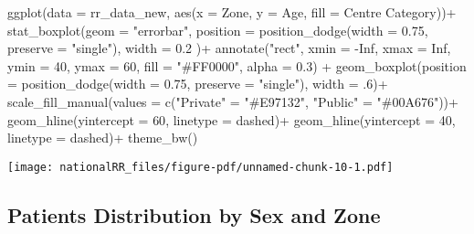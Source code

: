 \documentclass[
  letterpaper,
  DIV=11,
  numbers=noendperiod]{scrartcl}
\newenvironment{Shaded}{\begin{snugshade}}{\end{snugshade}}
\newcommand{\AttributeTok}[1]{\textcolor[rgb]{0.40,0.45,0.13}{#1}}
\newcommand{\ConstantTok}[1]{\textcolor[rgb]{0.56,0.35,0.01}{#1}}
\newcommand{\DecValTok}[1]{\textcolor[rgb]{0.68,0.00,0.00}{#1}}
\newcommand{\FloatTok}[1]{\textcolor[rgb]{0.68,0.00,0.00}{#1}}
\newcommand{\FunctionTok}[1]{\textcolor[rgb]{0.28,0.35,0.67}{#1}}
\newcommand{\NormalTok}[1]{\textcolor[rgb]{0.00,0.23,0.31}{#1}}
\newcommand{\OtherTok}[1]{\textcolor[rgb]{0.00,0.23,0.31}{#1}}
\newcommand{\SpecialCharTok}[1]{\textcolor[rgb]{0.37,0.37,0.37}{#1}}
\newcommand{\StringTok}[1]{\textcolor[rgb]{0.13,0.47,0.30}{#1}}
\begin{document}
\begin{Shaded}
\begin{Highlighting}[]
\FunctionTok{ggplot}\NormalTok{(}\AttributeTok{data =}\NormalTok{ rr\_data\_new, }\FunctionTok{aes}\NormalTok{(}\AttributeTok{x =}\NormalTok{ Zone, }\AttributeTok{y =}\NormalTok{ Age, }\AttributeTok{fill =} \StringTok{\textasciigrave{}}\AttributeTok{Centre Category}\StringTok{\textasciigrave{}}\NormalTok{))}\SpecialCharTok{+}
  \FunctionTok{stat\_boxplot}\NormalTok{(}\AttributeTok{geom =} \StringTok{"errorbar"}\NormalTok{,}
               \AttributeTok{position =} \FunctionTok{position\_dodge}\NormalTok{(}\AttributeTok{width =} \FloatTok{0.75}\NormalTok{, }\AttributeTok{preserve =} \StringTok{"single"}\NormalTok{),}
               \AttributeTok{width =} \FloatTok{0.2}
\NormalTok{               )}\SpecialCharTok{+}
  \FunctionTok{annotate}\NormalTok{(}\StringTok{"rect"}\NormalTok{, }\AttributeTok{xmin =} \SpecialCharTok{{-}}\ConstantTok{Inf}\NormalTok{, }\AttributeTok{xmax =} \ConstantTok{Inf}\NormalTok{, }\AttributeTok{ymin =} \DecValTok{40}\NormalTok{, }\AttributeTok{ymax =} \DecValTok{60}\NormalTok{, }
           \AttributeTok{fill =} \StringTok{"\#FF0000"}\NormalTok{, }\AttributeTok{alpha =} \FloatTok{0.3}\NormalTok{) }\SpecialCharTok{+}
  \FunctionTok{geom\_boxplot}\NormalTok{(}\AttributeTok{position =} \FunctionTok{position\_dodge}\NormalTok{(}\AttributeTok{width =} \FloatTok{0.75}\NormalTok{, }\AttributeTok{preserve =} \StringTok{"single"}\NormalTok{), }\AttributeTok{width =}\NormalTok{ .}\DecValTok{6}\NormalTok{)}\SpecialCharTok{+}
  \FunctionTok{scale\_fill\_manual}\NormalTok{(}\AttributeTok{values =} \FunctionTok{c}\NormalTok{(}\StringTok{"Private"} \OtherTok{=} \StringTok{"\#E97132"}\NormalTok{, }\StringTok{"Public"} \OtherTok{=} \StringTok{"\#00A676"}\NormalTok{))}\SpecialCharTok{+}
  \FunctionTok{geom\_hline}\NormalTok{(}\AttributeTok{yintercept =} \DecValTok{60}\NormalTok{, }\AttributeTok{linetype =} \StringTok{\textquotesingle{}dashed\textquotesingle{}}\NormalTok{)}\SpecialCharTok{+}
  \FunctionTok{geom\_hline}\NormalTok{(}\AttributeTok{yintercept =} \DecValTok{40}\NormalTok{, }\AttributeTok{linetype =} \StringTok{\textquotesingle{}dashed\textquotesingle{}}\NormalTok{)}\SpecialCharTok{+}
    \FunctionTok{theme\_bw}\NormalTok{()}
\end{Highlighting}
\end{Shaded}

\texttt{[image: nationalRR\_files/figure-pdf/unnamed-chunk-10-1.pdf]}

\subsection{Patients Distribution by Sex and
Zone}\label{patients-distribution-by-sex-and-zone}
\end{document}
